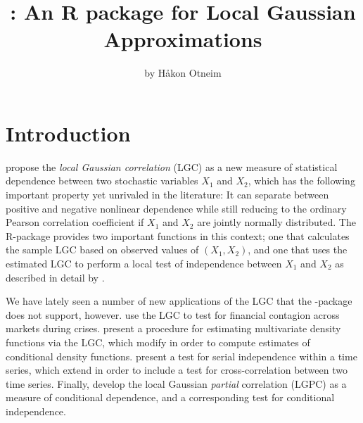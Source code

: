 \title{: An R package for Local Gaussian Approximations}
\author{by H{\aa}kon Otneim}

\maketitle


\section{Introduction}
\label{chap:introduction}

\citet{tjos:huft:2013} propose the \emph{local Gaussian correlation} (LGC) as a new measure of statistical dependence between two stochastic variables $X_1$ and $X_2$, which has the following important property yet unrivaled in the literature: It can separate between positive and negative nonlinear dependence while still reducing to the ordinary Pearson correlation coefficient if $X_1$ and $X_2$ are jointly normally distributed. The R-package  \citep{bere:klep:tjos:2014} provides two important functions in this context; one that calculates the sample LGC based on observed values of $(X_1,X_2)$, and one that uses the estimated LGC to perform a local test of independence between $X_1$ and $X_2$ as described in detail by \citet{bere:tjos:2014}.  

We have lately seen a number of new applications of the LGC that the -package does not support, however. \citet{stov:tjos:huft:2014} use the LGC to test for financial contagion across markets during crises. \citet{otne:tjos:2017} present a procedure for estimating multivariate density functions via the LGC, which \citet{otne:tjos:2018} modify in order to compute estimates of conditional density functions. \citet{laca:tjos:2017} present a test for serial independence within a time series, which \citet{laca:tjos:2018} extend in order to include a test for cross-correlation between two time series. Finally, \citet{otne:tjos:2019} develop the local Gaussian \emph{partial} correlation (LGPC) as a measure of conditional dependence, and a corresponding test for conditional independence. 

